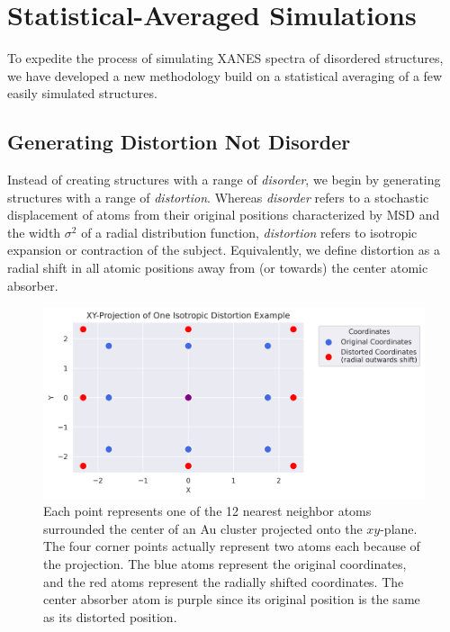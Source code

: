 \section{Statistical-Averaged Simulations}
To expedite the process of simulating XANES spectra of disordered structures, we have developed a new methodology build on a statistical averaging of a few easily simulated structures.

\subsection{Generating Distortion Not Disorder} \label{sec:start-disorder}
Instead of creating structures with a range of \textit{disorder}, we begin by generating structures with a range of \textit{distortion}. Whereas \textit{disorder} refers to a stochastic displacement of atoms from their original positions characterized by MSD and the width $ \sigma^2 $ of a radial distribution function, \textit{distortion} refers to isotropic expansion or contraction of the subject. Equivalently, we define distortion as a radial shift in all atomic positions away from (or towards) the center atomic absorber.

\begin{figure}[h]
	\centering
	\includegraphics[width=\linewidth]{Chapters/Figures/2d_distortion_example.png}
	\caption[2D Distortion]{Each point represents one of the 12 nearest neighbor atoms surrounded the center of an Au cluster projected onto the $xy$\nobreakdash-plane. The four corner points actually represent two atoms each because of the projection. The blue atoms represent the original coordinates, and the red atoms represent the radially shifted coordinates. The center absorber atom is purple since its original position is the same as its distorted position.}
	\label{fig:2d-distortion}
\end{figure}

